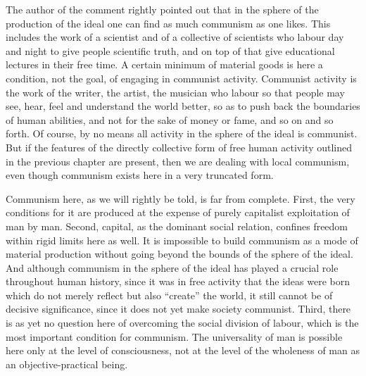 \documentclass[../main]{subfiles}
\begin{document}
The author of the comment rightly pointed out that in the sphere of the production of the ideal one can find as much communism as one likes. This includes the work of a scientist and of a collective of scientists who labour day and night to give people scientific truth, and on top of that give educational lectures in their free time. A certain minimum of material goods is here a condition, not the goal, of engaging in communist activity. Communist activity is the work of the writer, the artist, the musician who labour so that people may see, hear, feel and understand the world better, so as to push back the boundaries of human abilities, and not for the sake of money or fame, and so on and so forth. Of course, by no means all activity in the sphere of the ideal is communist. But if the features of the directly collective form of free human activity outlined in the previous chapter are present, then we are dealing with local communism, even though communism exists here in a very truncated form.

Communism here, as we will rightly be told, is far from complete. First, the very conditions for it are produced at the expense of purely capitalist exploitation of man by man. Second, capital, as the dominant social relation, confines freedom within rigid limits here as well. It is impossible to build communism as a mode of material production without going beyond the bounds of the sphere of the ideal. And although communism in the sphere of the ideal has played a crucial role throughout human history, since it was in free activity that the ideas were born which do not merely reflect but also “create” the world, it still cannot be of decisive significance, since it does not yet make society communist. Third, there is as yet no question here of overcoming the social division of labour, which is the most important condition for communism. The universality of man is possible here only at the level of consciousness, not at the level of the wholeness of man as an objective-practical being.
\end{document}
